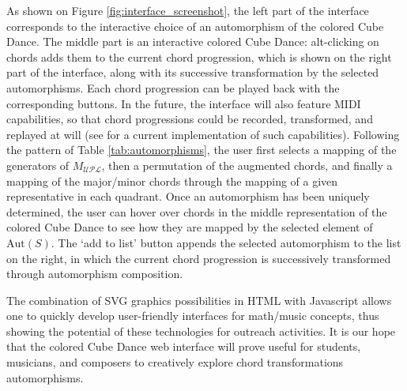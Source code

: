 \documentclass[10pt]{amsart}
\begin{document}
As shown on Figure \ref{fig:interface_screenshot}, the left part of the interface corresponds to the interactive choice of an automorphism of the colored Cube Dance. The middle part is an interactive colored Cube Dance: alt-clicking on chords adds them to the current chord progression, which is shown on the right part of the interface, along with its successive transformation by the selected automorphisms. Each chord progression can be played back with the corresponding buttons. In the future, the interface will also feature MIDI capabilities, so that chord progressions could be recorded, transformed, and replayed at will (see \cite{TonnetzGuichaoua} for a current implementation of such capabilities). Following the pattern of Table \ref{tab:automorphisms}, the user first selects a mapping of the generators of $M_{\mathcal{UPL}}$, then a permutation of the augmented chords, and finally a mapping of the major/minor chords through the mapping of a given representative in each quadrant. Once an automorphism has been uniquely determined, the user can hover over chords in the middle representation of the colored Cube Dance to see how they are mapped by the selected element of $\text{Aut}(S)$. The `add to list' button appends the selected automorphism to the list on the right, in which the current chord progression is successively transformed through automorphism composition.

The combination of SVG graphics possibilities in HTML with Javascript allows one to quickly develop user-friendly interfaces for math/music concepts, thus showing the potential of these technologies for outreach activities. It is our hope that the colored Cube Dance web interface will prove useful for students, musicians, and composers to creatively explore chord transformations  automorphisms.



\end{document}
